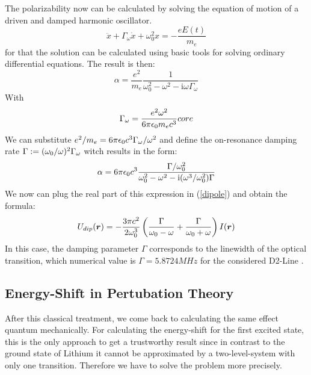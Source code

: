 The polarizability now can be calculated by solving the equation of motion of a driven and damped harmonic oscillator.
\begin{equation}
\ddot x+\Gamma_\omega\dot x+\omega^2_0x=-\frac{eE(t)}{m_e}
\end{equation} 
for that the solution can be calculated using basic tools for solving ordinary differential equations. The result is then:
\begin{equation}
\alpha=\frac{e^2}{m_e}\frac{1}{\omega^2_0-\omega^2-\mathrm{i}\omega\Gamma_\omega}
\end{equation} 
With
\begin{equation}
\Gamma_\omega=\frac{e^2\omega^2}{6\pi\epsilon_0m_ec^3}core
\end{equation}
We can substitute $e^2/m_e=6\pi\epsilon_0c^3\Gamma_\omega/\omega^2$ and define the on-resonance damping rate $\Gamma:=(\omega_0/\omega)^2\Gamma_\omega$ witch results in the form:
\begin{equation}
\alpha=6\pi\epsilon_0c^3\frac{\Gamma/\omega^2_0}{\omega^2_0-\omega^2-\mathrm{i}(\omega^3/\omega^2_0)\Gamma}
\end{equation} 
We now can plug the real part of this expression in (\ref{dipole}) and obtain the formula:
\begin{equation}
U_{dip}(\boldsymbol{r})=-\frac{3\pi c^2}{2\omega^3_0}\left(\frac{\Gamma}{\omega_0-\omega}+\frac{\Gamma}{\omega_0+\omega}\right	)I(\boldsymbol{r})
\label{classic}\end{equation}
In this case, the damping parameter $\Gamma$ corresponds to the linewidth of the optical transition, which numerical value is $\Gamma=5.8724 \unit{MHz}$ for the considered D2-Line \cite{gehm}.

\subsection{Energy-Shift in Pertubation Theory}

After this classical treatment, we come back to calculating the same effect quantum mechanically. For calculating the energy-shift for the first excited state, this is the only approach to get a trustworthy result since in contrast to the ground state of Lithium it cannot be approximated by a two-level-system with only one transition. Therefore we have to solve the problem more precisely. 

